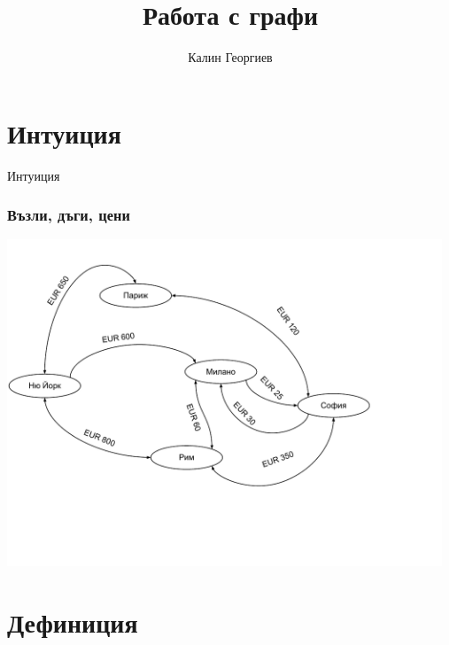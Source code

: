 \documentclass{beamer}
\begin{document}
\title[Структури от данни и програмиране]{Работа с графи} 
\author{Калин Георгиев} 
\frame{\titlepage} 

\section{Интуиция} 


\begin{frame}
\centerline{Интуиция}
\end{frame}


\begin{frame}[fragile]
\frametitle{Възли, дъги, цени}

\includegraphics[width=13cm]{images/graph_cities}

\end{frame}

\section{Дефиниция} 
\end{document}
